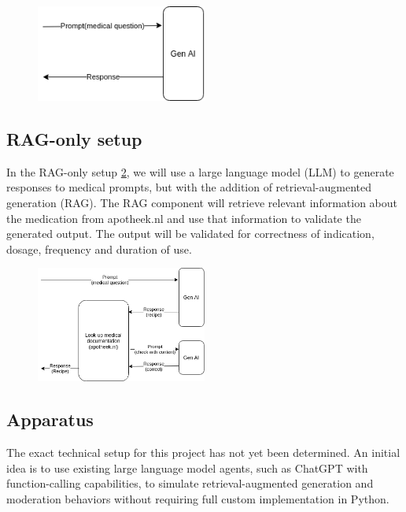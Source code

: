 \begin{figure}
    \includegraphics[width=0.5\textwidth]{figures/baselineSetup.png}
    \label{fig:baselineSetup}
\end{figure}

\subsection{RAG-only setup}

In the RAG-only setup \ref{fig:ragSetup}, we will use a large language model (LLM) to generate responses to medical prompts, but with the addition of retrieval-augmented generation (RAG).
The RAG component will retrieve relevant information about the medication from apotheek.nl and use that information to validate the generated output.
The output will be validated for correctness of indication, dosage, frequency and duration of use.

\begin{figure}
    \includegraphics[width=0.5\textwidth]{figures/RAGSetup.png}
    \label{fig:ragSetup}
\end{figure}

\subsection{Apparatus}

The exact technical setup for this project has not yet been determined. An initial idea is to use existing large language model agents, such as ChatGPT with function-calling capabilities, to simulate retrieval-augmented generation and moderation behaviors without requiring full custom implementation in Python.

